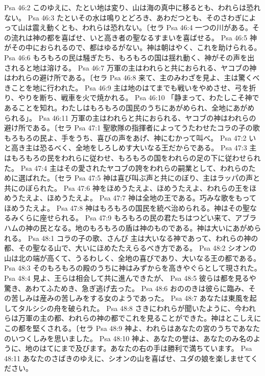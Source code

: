 Psa 46:2  このゆえに、たとい地は変り、山は海の真中に移るとも、われらは恐れない。
Psa 46:3  たといその水は鳴りとどろき、あわだつとも、そのさわぎによって山は震え動くとも、われらは恐れない。〔セラ
Psa 46:4  一つの川がある。その流れは神の都を喜ばせ、いと高き者の聖なるすまいを喜ばせる。
Psa 46:5  神がその中におられるので、都はゆるがない。神は朝はやく、これを助けられる。
Psa 46:6  もろもろの民は騒ぎたち、もろもろの国は揺れ動く、神がその声を出されると地は溶ける。
Psa 46:7  万軍の主はわれらと共におられる、ヤコブの神はわれらの避け所である。〔セラ
Psa 46:8  来て、主のみわざを見よ、主は驚くべきことを地に行われた。
Psa 46:9  主は地のはてまでも戦いをやめさせ、弓を折り、やりを断ち、戦車を火で焼かれる。
Psa 46:10  「静まって、わたしこそ神であることを知れ。わたしはもろもろの国民のうちにあがめられ、全地にあがめられる」。
Psa 46:11  万軍の主はわれらと共におられる、ヤコブの神はわれらの避け所である。〔セラ
Psa 47:1  聖歌隊の指揮者によってうたわせたコラの子の歌 もろもろの民よ、手をうち、喜びの声をあげ、神にむかって叫べ。
Psa 47:2  いと高き主は恐るべく、全地をしろしめす大いなる王だからである。
Psa 47:3  主はもろもろの民をわれらに従わせ、もろもろの国をわれらの足の下に従わせられた。
Psa 47:4  主はその愛されたヤコブの誇をわれらの嗣業として、われらのために選ばれた。〔セラ
Psa 47:5  神は喜び叫ぶ声と共にのぼり、主はラッパの声と共にのぼられた。
Psa 47:6  神をほめうたえよ、ほめうたえよ、われらの王をほめうたえよ、ほめうたえよ。
Psa 47:7  神は全地の王である。巧みな歌をもってほめうたえよ。
Psa 47:8  神はもろもろの国民を統べ治められる。神はその聖なるみくらに座せられる。
Psa 47:9  もろもろの民の君たちはつどい来て、アブラハムの神の民となる。地のもろもろの盾は神のものである。神は大いにあがめられる。
Psa 48:1  コラの子の歌、さんび 主は大いなる神であって、われらの神の都、その聖なる山で、大いにほめたたえらるべき方である。
Psa 48:2  シオンの山は北の端が高くて、うるわしく、全地の喜びであり、大いなる王の都である。
Psa 48:3  そのもろもろの殿のうちに神はみずからを高きやぐらとして現された。
Psa 48:4  見よ、王らは相会して共に進んできたが、
Psa 48:5  彼らは都を見るや驚き、あわてふためき、急ぎ逃げ去った。
Psa 48:6  おののきは彼らに臨み、その苦しみは産みの苦しみをする女のようであった。
Psa 48:7  あなたは東風を起してタルシシの舟を破られた。
Psa 48:8  さきにわれらが聞いたように、今われらは万軍の主の都、われらの神の都でこれを見ることができた。神はとこしえにこの都を堅くされる。〔セラ
Psa 48:9  神よ、われらはあなたの宮のうちであなたのいつくしみを思いました。
Psa 48:10  神よ、あなたの誉は、あなたのみ名のように、地のはてにまで及びます。あなたの右の手は勝利で満ちています。
Psa 48:11  あなたのさばきのゆえに、シオンの山を喜ばせ、ユダの娘を楽しませてください。
